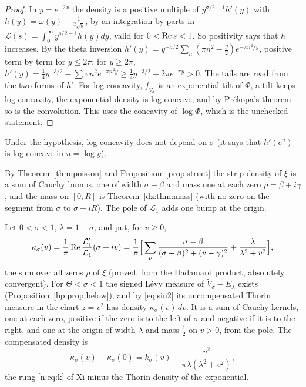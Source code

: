 \begin{proof}
In $y=e^{-2x}$ the density is a positive multiple of $y^{\sigma/2+1}h'(y)$ with $h(y)=\omega(y)-\frac1{2\sqrt y}$, by an integration by parts in $\mathcal L(s)=\int_0^\infty y^{s/2-1}h(y)dy$, valid for $0<\operatorname{Re} s<1$. So positivity says that $h$ increases. By the theta inversion $h'(y)=y^{-5/2}\sum_n(\pi n^2-\frac y2)e^{-\pi n^2/y}$, positive term by term for $y\le2\pi$; for $y\ge2\pi$, $h'(y)=\frac14y^{-3/2}-\sum\pi n^2e^{-\pi n^2y}\ge\frac14y^{-3/2}-2\pi e^{-\pi y}>0$. The tails are read from the two forms of $h'$. For log concavity, $f_{\tilde V_\sigma}$ is an exponential tilt of $\Phi$, a tilt keeps log concavity, the exponential density is log concave, and by Pr\'ekopa's theorem \cite{Prekopa73} so is the convolution. This uses the concavity of $\log\Phi$, which is the unchecked statement.
\end{proof}

Under the hypothesis, log concavity does not depend on $\sigma$ (it says that $h'(e^u)$ is log concave in $u=\log y$).

By Theorem~\ref{thm:poisson} and Proposition~\ref{prop:struct} the strip density of $\xi$ is a sum of Cauchy bumps, one of width $\sigma-\beta$ and mass one at each zero $\rho=\beta+i\gamma$, and the mass on $[0,R]$ is Theorem~\ref{dz:thm:mass} (with no zero on the segment from $\sigma$ to $\sigma+iR$). The pole of $\mathcal L_1$ adds one bump at the origin.

\begin{theorem}\label{nf:thm:stripthorin}
Let $0<\sigma<1$, $\lambda=1-\sigma$, and put, for $v\ge0$,
\[
\kappa_\sigma(v)=\frac1\pi\operatorname{Re}\frac{\mathcal L_1'}{\mathcal L_1}(\sigma+iv)=\frac1\pi\Big[\sum_\rho\frac{\sigma-\beta}{(\sigma-\beta)^2+(v-\gamma)^2}+\frac\lambda{\lambda^2+v^2}\Big],
\]
the sum over all zeros $\rho$ of $\xi$ (proved, from the Hadamard product, absolutely convergent). For $\Theta<\sigma<1$ the signed L\'evy measure of $\tilde V_\sigma-E_\lambda$ exists (Proposition~\ref{bp:prop:below}), and by \eqref{eq:sin2} its uncompensated Thorin measure in the chart $z=v^2$ has density $\kappa_\sigma(v)\,dv$. It is a sum of Cauchy kernels, one at each zero, positive if the zero is to the left of $\sigma$ and negative if it is to the right, and one at the origin of width $\lambda$ and mass $\frac12$ on $v>0$, from the pole. The compensated density is
\[
\kappa_\sigma(v)-\kappa_\sigma(0)=k_\sigma(v)-\frac{v^2}{\pi\lambda(\lambda^2+v^2)},
\]
the rung \eqref{n:eq:k} of Xi minus the Thorin density of the exponential.
\end{theorem}

